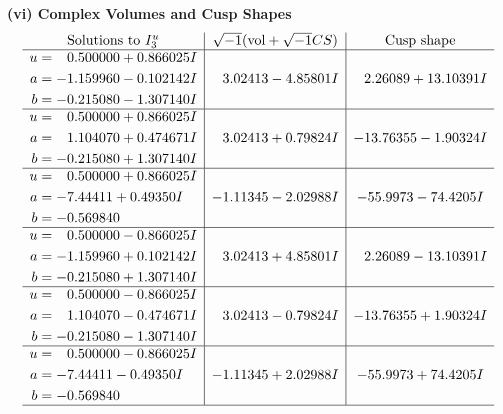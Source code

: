 \documentclass[1p]{elsarticle_modified}
\theoremstyle{definition}
\newcommand{\I}{\sqrt{-1}}
\begin{document}
\newpage\flushleft \textbf{(vi) Complex Volumes and Cusp Shapes}
$$\begin{array}{c|c|c}  
\text{Solutions to }I^u_{3}& \I (\text{vol} + \sqrt{-1}CS) & \text{Cusp shape}\\
 \hline 
\begin{aligned}
u &= \phantom{-}0.500000 + 0.866025 I \\
a &= -1.159960 - 0.102142 I \\
b &= -0.215080 - 1.307140 I\end{aligned}
 & \phantom{-}3.02413 - 4.85801 I & \phantom{-}2.26089 + 13.10391 I \\ \hline\begin{aligned}
u &= \phantom{-}0.500000 + 0.866025 I \\
a &= \phantom{-}1.104070 + 0.474671 I \\
b &= -0.215080 + 1.307140 I\end{aligned}
 & \phantom{-}3.02413 + 0.79824 I & -13.76355 - 1.90324 I \\ \hline\begin{aligned}
u &= \phantom{-}0.500000 + 0.866025 I \\
a &= -7.44411 + 0.49350 I \\
b &= -0.569840\phantom{ +0.000000I}\end{aligned}
 & -1.11345 - 2.02988 I & -55.9973 - 74.4205 I \\ \hline\begin{aligned}
u &= \phantom{-}0.500000 - 0.866025 I \\
a &= -1.159960 + 0.102142 I \\
b &= -0.215080 + 1.307140 I\end{aligned}
 & \phantom{-}3.02413 + 4.85801 I & \phantom{-}2.26089 - 13.10391 I \\ \hline\begin{aligned}
u &= \phantom{-}0.500000 - 0.866025 I \\
a &= \phantom{-}1.104070 - 0.474671 I \\
b &= -0.215080 - 1.307140 I\end{aligned}
 & \phantom{-}3.02413 - 0.79824 I & -13.76355 + 1.90324 I \\ \hline\begin{aligned}
u &= \phantom{-}0.500000 - 0.866025 I \\
a &= -7.44411 - 0.49350 I \\
b &= -0.569840\phantom{ +0.000000I}\end{aligned}
 & -1.11345 + 2.02988 I & -55.9973 + 74.4205 I\\
 \hline 
 \end{array}$$\newpage\newpage\renewcommand{\arraystretch}{1}
\end{document}
